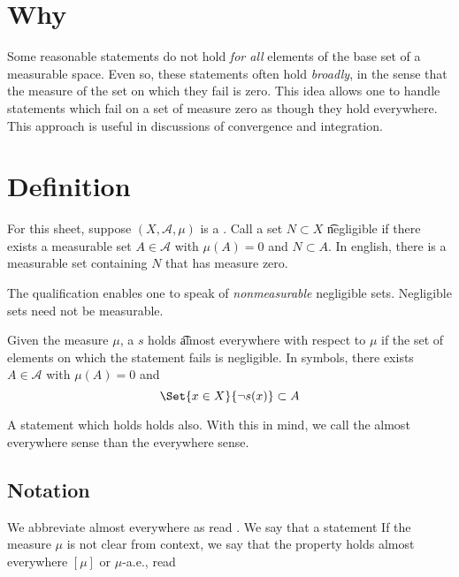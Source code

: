 

\section*{Why}

Some reasonable statements do not hold \textit{for all} elements of the base set of a measurable space.
Even so, these statements often hold \textit{broadly}, in the sense that the measure of the set on which they fail is zero.
This idea allows one to handle statements which fail on a set of measure zero as though they hold everywhere.
This approach is useful in discussions of convergence and integration.

\section*{Definition}

For this sheet, suppose $(X, \mathcal{A} , \mu )$ is a .
Call a set $N \subset X$ \t{negligible} if there exists a measurable set $A \in \mathcal{A} $ with $\mu (A) = 0$ and $N \subset A$.
In english, there is a measurable set containing $N$ that has measure zero.

The qualification  enables one to speak of \textit{nonmeasurable} negligible sets.
Negligible sets need not be measurable.

Given the measure $\mu $, a $s$ holds \t{almost everywhere} with respect to $\mu $ if the set of elements on which the statement fails is negligible.
In symbols, there exists $A \in \mathcal{A} $ with $\mu (A) = 0$ and
    \[
\Set{x \in X}{\neg s(x)} \subset A
    \]

A statement which holds  holds  also.
With this in mind, we call the almost everywhere sense  than the everywhere sense.

\subsection*{Notation}

We abbreviate almost everywhere as  read .
We say that a statement 
If the measure $\mu $ is not clear from context, we say that the property holds almost everywhere $[\mu ]$ or $\mu $-a.e., read 

